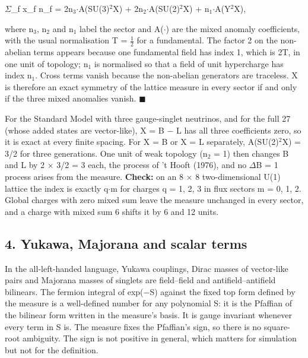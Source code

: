 \documentclass[
  11pt,
]{article}
\begin{document}
\ensuremath{\Sigma}\_f x\_f n\_f = 2n\ensuremath{_{3}}\ensuremath{\cdot}A(SU(3)\ensuremath{^{2}}X) + 2n\ensuremath{_{2}}\ensuremath{\cdot}A(SU(2)\ensuremath{^{2}}X) + n\ensuremath{_{1}}\ensuremath{\cdot}A(Y\ensuremath{^{2}}X),

where n\ensuremath{_{3}}, n\ensuremath{_{2}} and n\ensuremath{_{1}} label the sector and A(\ensuremath{\cdot}) are the mixed anomaly coefficients, with the usual normalisation T = \ensuremath{\frac{1}{2}} for a fundamental. The factor 2 on the non-abelian terms appears because one fundamental field has index 1, which is 2T, in one unit of topology; n\ensuremath{_{1}} is normalised so that a field of unit hypercharge has index n\ensuremath{_{1}}. Cross terms vanish because the non-abelian generators are traceless. X is therefore an exact symmetry of the lattice measure in every sector if and only if the three mixed anomalies vanish. \ensuremath{\blacksquare}

For the Standard Model with three gauge-singlet neutrinos, and for the full 27 (whose added states are vector-like), X = B \ensuremath{-} L has all three coefficients zero, so it is exact at every finite spacing. For X = B or X = L separately, A(SU(2)\ensuremath{^{2}}X) = 3/2 for three generations. One unit of weak topology (n\ensuremath{_{2}} = 1) then changes B and L by 2 \ensuremath{\times} 3/2 = 3 each, the process of 't Hooft (1976), and no \ensuremath{\Delta}B = 1 process arises from the measure. \textbf{Check:} on an 8 \ensuremath{\times} 8 two-dimensional U(1) lattice the index is exactly q\ensuremath{\cdot}m for charges q = 1, 2, 3 in flux sectors m = 0, 1, 2. Global charges with zero mixed sum leave the measure unchanged in every sector, and a charge with mixed sum 6 shifts it by 6 and 12 units.

\hypertarget{yukawa-majorana-and-scalar-terms}{%
\subsection{4. Yukawa, Majorana and scalar terms}\label{yukawa-majorana-and-scalar-terms}}

In the all-left-handed language, Yukawa couplings, Dirac masses of vector-like pairs and Majorana masses of singlets are field--field and antifield--antifield bilinears. The fermion integral of exp(\ensuremath{-}S) against the fixed top form defined by the measure is a well-defined number for any polynomial S: it is the Pfaffian of the bilinear form written in the measure's basis. It is gauge invariant whenever every term in S is. The measure fixes the Pfaffian's sign, so there is no square-root ambiguity. The sign is not positive in general, which matters for simulation but not for the definition.
\end{document}

